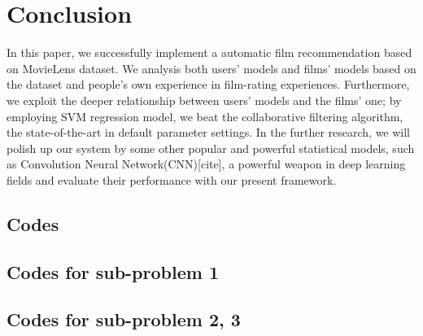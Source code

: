 \section{Conclusion}
In this paper, we successfully implement a automatic film recommendation based on MovieLens dataset. We analysis both users' models and films' models based on the dataset and people's own experience in film-rating experiences. Furthermore, we exploit the deeper relationship between users' models and the films' one; by employing SVM regression model, we beat the collaborative filtering algorithm, the state-of-the-art in default parameter settings. In the further research, we will polish up our system by some other popular and powerful statistical models, such as Convolution Neural Network(CNN)[cite], a powerful weapon in deep learning fields and evaluate their performance with our present framework.

\begin{appendices}
\section{Codes}
\subsection{Codes for sub-problem 1}

\subsection{Codes for sub-problem 2, 3}


\end{appendices}